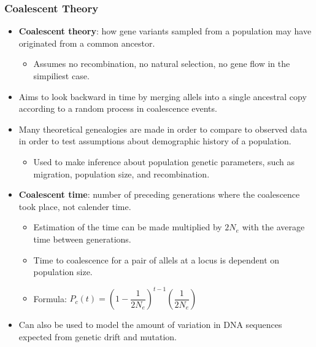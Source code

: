 \documentclass[12pt,a4paper]{article}
\begin{document}
\begin{itemize}
    \subsubsection{Coalescent Theory}
    \begin{itemize}
        \item \textbf{Coalescent theory}: how gene variants sampled from a population may have {\color{o-Sun}originated} from a common ancestor.
            \begin{itemize}
                \item Assumes no recombination, no natural selection, no gene flow in the simpiliest case.
            \end{itemize}
        \item Aims to look backward in time by merging allels into a single ancestral copy according to a random process in coalescence events.
        \item Many theoretical genealogies are made in order to compare to observed data in order to test assumptions about demographic history of a population.
            \begin{itemize}
                \item Used to make inference about population genetic parameters, such as migration, population size, and recombination.
            \end{itemize}
        \item \textbf{Coalescent time}: number of preceding generations where the coalescence took place, not calender time.
            \begin{itemize}
                \item Estimation of the time can be made multiplied by \(2N_e\) with the average time between generations.
                \item Time to coalescence for a pair of allels at a locus is {\color{o-Sun}dependent} on population size.
                \item Formula: \(P_c(t)=\left(1-\dfrac{1}{2N_e}\right)^{t-1}\left(\dfrac{1}{2N_e}\right)\)
            \end{itemize}
        \item Can also be used to model the amount of variation in DNA sequences expected from genetic drift and mutation.
    \end{itemize}
\end{itemize}
\end{document}
